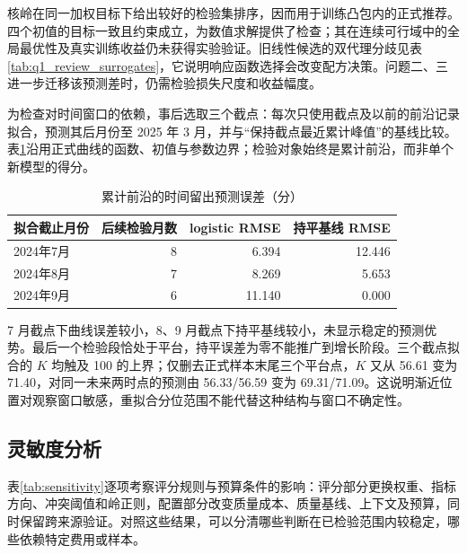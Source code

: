 核岭在同一加权目标下给出较好的检验集排序，因而用于训练凸包内的正式推荐。四个初值的目标一致且约束成立，为数值求解提供了检查；其在连续可行域中的全局最优性及真实训练收益仍未获得实验验证。旧线性候选的双代理分歧见表\ref{tab:q1_review_surrogates}，它说明响应函数选择会改变配方决策。问题二、三进一步迁移该预测差时，仍需检验损失尺度和收益幅度。

为检查对时间窗口的依赖，事后选取三个截点：每次只使用截点及以前的前沿记录拟合，预测其后月份至 2025 年 3 月，并与“保持截点最近累计峰值”的基线比较。表\ref{tab:time_holdout}沿用正式曲线的函数、初值与参数边界；检验对象始终是累计前沿，而非单个新模型的得分。

\begin{table}[!htbp]
\centering
\caption{累计前沿的时间留出预测误差（分）}\label{tab:time_holdout}
\begin{tabular}{@{}lrrr@{}}
\toprule
拟合截止月份 & 后续检验月数 & logistic RMSE & 持平基线 RMSE\\
\midrule
2024年7月 & 8 & 6.394 & 12.446\\
2024年8月 & 7 & 8.269 & 5.653\\
2024年9月 & 6 & 11.140 & 0.000\\
\bottomrule
\end{tabular}
\end{table}

7 月截点下曲线误差较小，8、9 月截点下持平基线较小，未显示稳定的预测优势。最后一个检验段恰处于平台，持平误差为零不能推广到增长阶段。三个截点拟合的 $K$ 均触及 100 的上界；仅删去正式样本末尾三个平台点，$K$ 又从 56.61 变为 71.40，对同一未来两时点的预测由 56.33/56.59 变为 69.31/71.09。这说明渐近位置对观察窗口敏感，重拟合分位范围不能代替这种结构与窗口不确定性。

\FloatBarrier
\subsection{灵敏度分析}
\label{sec:sensitivity}

表\ref{tab:sensitivity}逐项考察评分规则与预算条件的影响：评分部分更换权重、指标方向、冲突阈值和岭正则，配置部分改变质量成本、质量基线、上下文及预算，同时保留跨来源验证。对照这些结果，可以分清哪些判断在已检验范围内较稳定，哪些依赖特定费用或样本。

